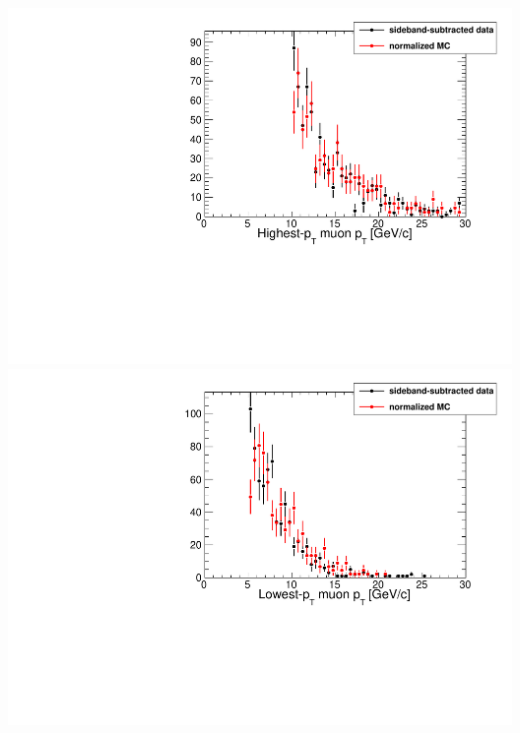 \documentclass[compress]{beamer}
\begin{document}
\begin{frame}
\vspace{0.25 cm}
\includegraphics[width=0.5\linewidth]{phi_muon1pt.pdf}
\includegraphics[width=0.5\linewidth]{phi_muon2pt.pdf}
\end{frame}
\end{document}
